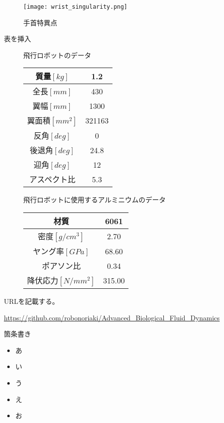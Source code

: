 \documentclass [titlepage, a4j, 11pt] {jsarticle}
\makeatletter
\newcommand{\tblcaption}[1]{\def\@captype{table}\caption{#1}}
\makeatother
\begin{document}
\begin{figure}[H]
	\begin{center}
		\texttt{[image: wrist\_singularity.png]} %
		\caption{手首特異点}
		\label{fig:sin3}
	\end{center}
\end{figure}
表を挿入
\begin{figure}[H]
\begin{minipage}{0.5 \hsize}
	\begin{center}
    \tblcaption{飛行ロボットのデータ}
    \label{table:data}
	\begin{tabular}{|c|c|}\hline
		質量$[kg] $& 1.2\\ \hline
		全長$[mm] $& 430\\ \hline
		翼幅$[mm] $& 1300 \\ \hline
		翼面積$[mm^2]$ & 321163 \\ \hline
		反角$[deg]$ & 0 \\ \hline
		後退角$[deg]$ & 24.8 \\ \hline
		迎角$[deg]$ & 12 \\ \hline
		アスペクト比 & 5.3 \\ \hline
	\end{tabular}
	\end{center}
	\end{minipage}
	\begin{minipage}{0.5 \hsize}
	\begin{center}
    \tblcaption{飛行ロボットに使用するアルミニウムのデータ}
    \label{table:almi}
	\begin{tabular}{|c|c|}\hline
		材質 & 6061\\ \hline
		密度$[g/cm^3]$ & 2.70 \\ \hline
		ヤング率$[GPa]$ & 68.60 \\ \hline
		ポアソン比 & 0.34 \\ \hline
		降伏応力$[N/mm^2]$ & 315.00 \\ \hline
	\end{tabular}
	\end{center}
	\end{minipage}
\end{figure}
URLを記載する。\par
\url{https://github.com/robonoriaki/Advanced_Biological_Fluid_Dynamics}

箇条書き
\begin{itemize}
\item あ
\item い
\item う
\item え
\item お

\end{itemize}
\end{document}
